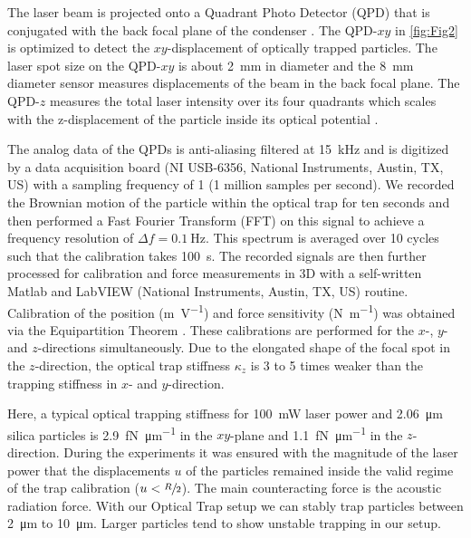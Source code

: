 The laser beam is projected onto a Quadrant Photo Detector (QPD) that is 
conjugated with the back focal plane of the condenser \cite{Bodensiek}. The 
QPD-$xy$ in \cref{fig:Fig2} is optimized to detect the $xy$-displacement of 
optically trapped particles. The laser spot size on the QPD-$xy$ is about 
\SI{2}{\mm} in diameter and the \SI{8}{\mm} diameter sensor measures 
displacements of the beam in the back focal plane. The QPD-$z$ measures the 
total laser intensity over its four quadrants which scales with the 
z-displacement of the particle inside its optical potential \cite{Dreyer}.

The analog data of the QPDs is anti-aliasing filtered at \SI{15}{\kilo\hertz} 
and is digitized by a data acquisition board (NI USB-6356, National Instruments, 
Austin, TX, US) with a sampling frequency of \SI{1}{\MS} (1 million samples per 
second). We recorded the Brownian motion of the particle within the optical trap 
for ten seconds and then performed a Fast Fourier Transform (FFT) on this signal 
to achieve a frequency resolution of $\Delta f=\SI{0.1}{\hertz}$. This spectrum 
is averaged over 10 cycles such that the calibration takes \SI{100}{\second}.  
The recorded signals are then further processed for calibration and force 
measurements in 3D with a self-written Matlab and LabVIEW (National Instruments, 
Austin, TX, US) routine.  Calibration of the position (\si{\meter\per\volt}) and 
force sensitivity (\si{\newton\per\meter}) was obtained via the Equipartition 
Theorem \cite{Svoboda,Vermeulen}. These calibrations are performed for the $x$-, 
$y$- and $z$-directions simultaneously. Due to the elongated shape of the focal 
spot in the $z$-direction, the optical trap stiffness $\kappa_z$ is 3 to 5 times 
weaker than the trapping stiffness in $x$- and $y$-direction. 

Here, a typical optical trapping stiffness for \SI{100}{\milli\watt} laser power 
and \SI{2.06}{\micro\meter} silica particles is 
\SI{2.9}{\femto\newton\per\micro\meter} in the $xy$-plane and 
\SI{1.1}{\femto\newton\per\micro\meter} in the $z$-direction. During the 
experiments it was ensured with the magnitude of the laser power that the 
displacements $u$ of the particles remained inside the valid regime of the trap 
calibration ($u<\sfrac{R}{2}$). The main counteracting force is the acoustic 
radiation force. With our Optical Trap setup we can stably trap particles 
between \SI{2}{\micro\meter} to \SI{10}{\micro\meter}. Larger particles tend to 
show unstable trapping in our setup.

